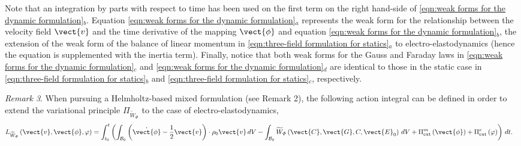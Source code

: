 %
Note that an integration by parts with respect to time has been used on the first term on the right hand-side of \eqref{eqn:weak forms for the dynamic formulation}$_b$.
Equation \eqref{eqn:weak forms for the dynamic formulation}$_a$ represents the weak form for the relationship between the velocity field $\vect{v}$ and the time derivative of the mapping $\vect{\phi}$ and
equation \eqref{eqn:weak forms for the dynamic formulation}$_b$,  the extension of the weak form of the balance of linear momentum in \eqref{eqn:three-field formulation for statics}$_a$ to electro-elastodynamics (hence the equation is supplemented with the inertia term). 
Finally, notice that both weak forms for the Gauss and Faraday laws in \eqref{eqn:weak forms for the dynamic formulation}$_c$ and \eqref{eqn:weak forms for the dynamic formulation}$_d$ are identical to those in the static case in \eqref{eqn:three-field formulation for statics}$_b$ and \eqref{eqn:three-field formulation for statics}$_c$, respectively. 

\noindent\makebox[\linewidth]{\rule{\textwidth}{0.4pt}}

\noindent \textit{Remark 3}. When pursuing a Helmholtz-based mixed formulation (see Remark 2), the following action integral can be defined in order to extend the variational principle $\Pi_{\widetilde{W}_{\varPhi}}$ to the case of electro-elastodynamics,
%
\begin{equation}\label{eqn:action integral Helmholtz}
\begin{aligned}
L_{\widetilde{W}_{\varPhi}}\left(\vect{v},\vect{\phi},\varphi\right) = \int_{t_0}^{t}&\left(\int_{\mathcal{B}_0}\left(\dot{\vect{\phi}} - \frac{1}{2}{\vect{v}}\right)\cdot\rho_0{\vect{v}}\,dV - 
%
\int_{\mathcal{B}_0}\widetilde{W}_{\varPhi}\left(\vect{C},\vect{G},C,\vect{E}_0\right)\,dV + \Pi_{\text{ext}}^m\left(\vect{\phi}\right) + \Pi_{\text{ext}}^e\left(\varphi\right)
\right)\,dt.
\end{aligned}
\end{equation}

